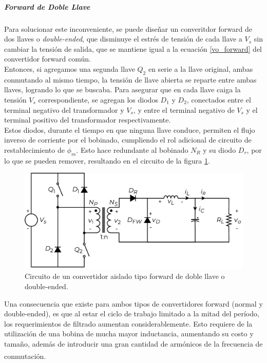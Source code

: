 \subparagraph{Forward de Doble Llave}

Para solucionar este inconveniente, se puede diseñar un converitdor forward de dos llaves o \textit{double-ended}, que disminuye el estrés de tensión de cada llave a $V_s$ sin cambiar la tensión de salida, que se mantiene igual a la ecuación \ref{vo_forward} del convertidor forward común.\\

Entonces, si agregamos una segunda llave $Q_2$ en serie a la llave original, ambas conmutando al mismo tiempo, la tensión de llave abierta se reparte entre ambas llaves, logrando lo que se buscaba. Para asegurar que en cada llave caiga la tensión $V_s$ correspondiente, se agregan los diodos $D_1$ y $D_2$, conectados entre el terminal negativo del transformador y $V_s$, y entre el terminal negativo de $V_s$ y el terminal positivo del transformador respectivamente.\\

Estos diodos, durante el tiempo en que ninguna llave conduce, permiten el flujo inverso de corriente por el bobinado, cumpliendo el rol adicional de circuito de restablecimiento de $\phi_m$. Esto hace redundante al bobinado $N_R$ y su diodo $D_r$, por lo que se pueden remover, resultando en el circuito de la figura \ref{forward_doubleended}.\\

\begin{figure}[h]
    \centering
    \includegraphics[scale=0.6]{Imagenes/Forward Double-Ended.pdf}
    \caption{Circuito de un convertidor aislado tipo forward de doble llave o double-ended.}
    \label{forward_doubleended}
\end{figure}

Una consecuencia que existe para ambos tipos de convertidores forward (normal y double-ended), es que al estar el ciclo de trabajo limitado a la mitad del período, los requerimientos de filtrado aumentan considerablemente. Esto requiere de la utilización de una bobina de mucha mayor inductancia, aumentando su costo y tamaño, además de introducir una gran cantidad de armónicos de la frecuencia de conmutación.\textsuperscript{\cite{SoftSwitchPWM}}\\

